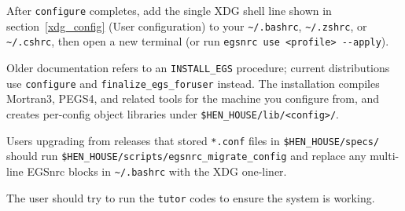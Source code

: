After \verb+configure+ completes, add the single XDG shell line shown in
section~\ref{xdg_config} (User configuration) to your \verb+~/.bashrc+,
\verb+~/.zshrc+, or \verb+~/.cshrc+, then open a new terminal (or run
\verb+egsnrc use <profile> --apply+).

Older documentation refers to an \verb+INSTALL_EGS+ procedure; current
distributions use \verb+configure+ and \verb+finalize_egs_foruser+ instead.
The installation compiles Mortran3, PEGS4, and related tools for the machine
you configure from, and creates per-config object libraries under
\verb+$HEN_HOUSE/lib/<config>/+.

Users upgrading from releases that stored \verb+*.conf+ files in
\verb+$HEN_HOUSE/specs/+ should run
\verb+$HEN_HOUSE/scripts/egsnrc_migrate_config+ and replace any multi-line
EGSnrc blocks in \verb+~/.bashrc+ with the XDG one-liner.

The user should try to run the {\tt tutor} codes to ensure the system is working.

%


